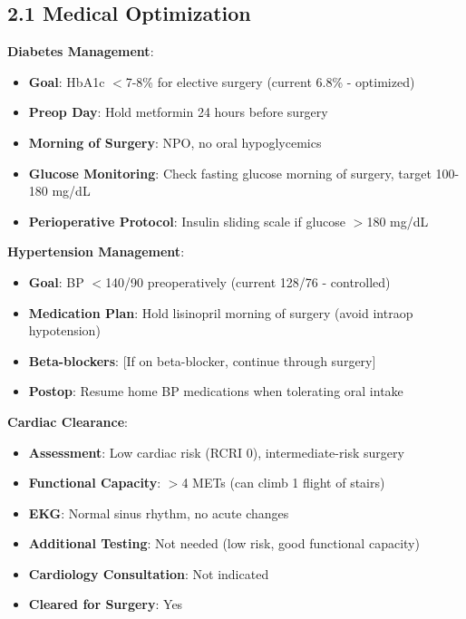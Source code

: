 \documentclass[11pt,letterpaper]{article}
\begin{document}
\subsection*{2.1 Medical Optimization}

\textbf{Diabetes Management}:
\begin{itemize}[leftmargin=*]
    \item \textbf{Goal}: HbA1c $<$7-8\% for elective surgery (current 6.8\% - optimized)
    \item \textbf{Preop Day}: Hold metformin 24 hours before surgery
    \item \textbf{Morning of Surgery}: NPO, no oral hypoglycemics
    \item \textbf{Glucose Monitoring}: Check fasting glucose morning of surgery, target 100-180 mg/dL
    \item \textbf{Perioperative Protocol}: Insulin sliding scale if glucose $>$180 mg/dL
\end{itemize}

\textbf{Hypertension Management}:
\begin{itemize}[leftmargin=*]
    \item \textbf{Goal}: BP $<$140/90 preoperatively (current 128/76 - controlled)
    \item \textbf{Medication Plan}: Hold lisinopril morning of surgery (avoid intraop hypotension)
    \item \textbf{Beta-blockers}: [If on beta-blocker, continue through surgery]
    \item \textbf{Postop}: Resume home BP medications when tolerating oral intake
\end{itemize}

\textbf{Cardiac Clearance}:
\begin{itemize}[leftmargin=*]
    \item \textbf{Assessment}: Low cardiac risk (RCRI 0), intermediate-risk surgery
    \item \textbf{Functional Capacity}: $>$4 METs (can climb 1 flight of stairs)
    \item \textbf{EKG}: Normal sinus rhythm, no acute changes
    \item \textbf{Additional Testing}: Not needed (low risk, good functional capacity)
    \item \textbf{Cardiology Consultation}: Not indicated
    \item \textbf{Cleared for Surgery}: Yes
\end{itemize}
\end{document}
